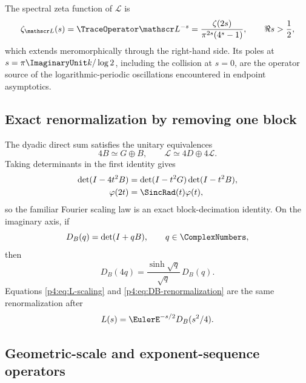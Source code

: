 \documentclass[11pt]{article}
\theoremstyle{definition}
\theoremstyle{remark}
\newcommand{\phiF}{\varphi}
\begin{document}
The spectral zeta function of \(\mathscr L\) is
\begin{equation}
 \zeta_{\mathscr L}(s)=\TraceOperator\mathscr L^{-s}
 =\frac{\zeta(2s)}{\pi^{2s}(4^s-1)},
 \qquad \Re s>\frac12,
 \label{p4:eq:L-spectral-zeta}
\end{equation}
which extends meromorphically through the right-hand side.  Its poles at
\(s=\pi\ImaginaryUnit k/\log2\), including the collision at \(s=0\), are the operator source of
the logarithmic-periodic oscillations encountered in endpoint asymptotics.

\subsection{Exact renormalization by removing one block}

The dyadic direct sum satisfies the unitary equivalences
\begin{equation}
 4B\simeq G\oplus B,
 \qquad
 \mathscr L\simeq4D\oplus4\mathscr L.
 \label{p4:eq:operator-renormalization}
\end{equation}
Taking determinants in the first identity gives
\begin{align}
 \det(I-4t^2B)
 &=\det(I-t^2G)\det(I-t^2B),\notag\\
 \phiF(2t)&=\SincRad(t)\phiF(t),
 \label{p4:eq:det-renormalization}
\end{align}
so the familiar Fourier scaling law is an exact block-decimation identity.  On the
imaginary axis, if
\begin{equation}
 D_B(q)=\det(I+qB),\qquad q\in\ComplexNumbers,
 \label{p4:eq:DB}
\end{equation}
then
\begin{equation}
 D_B(4q)=\frac{\sinh\sqrt q}{\sqrt q}\,D_B(q).
 \label{p4:eq:DB-renormalization}
\end{equation}
Equations \eqref{p4:eq:L-scaling} and \eqref{p4:eq:DB-renormalization} are the same
renormalization after
\begin{equation}
 L(s)=\EulerE^{-s/2}D_B(s^2/4).
 \label{p4:eq:L-DB}
\end{equation}

\subsection{Geometric-scale and exponent-sequence operators}
\label{p4:sec:operator-generalization}
\end{document}

